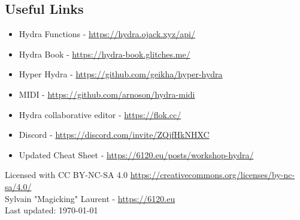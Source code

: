 \documentclass[9pt,oneside]{amsart}
\begin{document}
\subsection*{Useful Links}
\begin{itemize}
\item Hydra Functions - \url{https://hydra.ojack.xyz/api/}
\item Hydra Book - \url{https://hydra-book.glitches.me/}
\item Hyper Hydra - \url{https://github.com/geikha/hyper-hydra}
\item MIDI - \url{https://github.com/arnoson/hydra-midi}
\item Hydra collaborative editor - \url{https://flok.cc/}
\item Discord - \url{https://discord.com/invite/ZQjfHkNHXC}
\item Updated Cheat Sheet - \url{https://6120.eu/posts/workshop-hydra/}
\end{itemize}
\vspace{2cm}
Licensed with CC BY-NC-SA 4.0 \url{https://creativecommons.org/licenses/by-nc-sa/4.0/} \\
Sylvain "Magicking" Laurent - \url{https://6120.eu} \\
Last updated: \today\\
\end{document}
